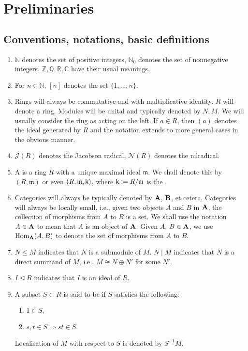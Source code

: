 \section{Preliminaries}

\subsection{Conventions, notations, basic definitions}

\begin{enumerate}
	\item $\mathbb{N}$ denotes the set of positive integers, $\mathbb{N}_{0}$ denotes the set of nonnegative integers. $\mathbb{Z}, \mathbb{Q}, \mathbb{R}, \mathbb{C}$ have their usual meanings.
	\item For $n \in \mathbb{N}$, $[n]$ denotes the set $\{1, \ldots, n\}$.
	\item Rings will always be commutative and with multiplicative identity. $R$ will denote a ring. Modules will be unital and typically denoted by $N, M$. We will usually consider the ring as acting on the left. \newline
	If $a \in R$, then $(a)$ denotes the ideal generated by $R$ and the notation extends to more general cases in the obvious manner.
	\item $\mathcal{J}(R)$ denotes the Jacobson radical, $\mathcal{N}(R)$ denotes the nilradical.
	\item A  is a ring $R$ with a unique maximal ideal $\mathfrak{m}$. We shall denote this by $(R, \mathfrak{m})$ or even $(R, \mathfrak{m}, \mathsf{k})$, where $\mathsf{k} \vcentcolon= R/\mathfrak{m}$ is the .
	\item Categories will always be typically denoted by $\mathbf{A}$, $\mathbf{B}$, et cetera. Categories will always be locally small, i.e., given two objects $A$ and $B$ in $\mathbf{A}$, the collection of morphisms from $A$ to $B$ is a set. \newline
	We shall use the notation $A \in \mathbf{A}$ to mean that $A$ is an object of $\mathbf{A}$. \newline
	Given $A$, $B \in \mathbf{A}$, we use $\operatorname{Hom}_{\mathbf{A}}(A, B)$ to denote the set of morphisms from $A$ to $B$.
	\item $N \le M$ indicates that $N$ is a submodule of $M$. \newline
	$N \mid M$ indicates that $N$ is a direct summand of $M$, i.e., $M \cong N \oplus N'$ for some $N'$.
	\item $I \unlhd R$ indicates that $I$ is an ideal of $R$.
	\item A subset $S \subset R$ is said to be  if $S$ satisfies the following:
	\begin{enumerate}
		\item $1 \in S$,
		\item $s, t \in S \Rightarrow st \in S$.
	\end{enumerate}
	Localisation of $M$ with respect to $S$ is denoted by $S^{-1}M$. 


\end{enumerate}
